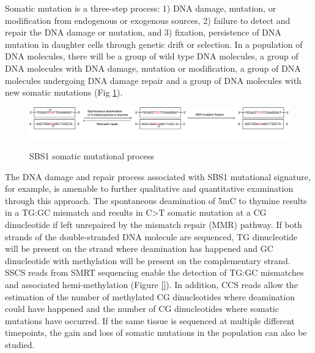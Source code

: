 Somatic mutation is a three-step process: 1) DNA damage, mutation, or modification from endogenous or exogenous sources, 2) failure to detect and repair the DNA damage or mutation, and 3) fixation, persistence of DNA mutation in daughter cells through genetic drift or selection. In a population of DNA molecules, there will be a group of wild type DNA molecules, a group of DNA molecules with DNA damage, mutation or modification, a group of DNA molecules undergoing DNA damage repair and a group of DNA molecules with new somatic mutations (Fig \ref{figure:single-strand-specific-mutation}). 

\begin{figure}[h]
\caption{SBS1 somatic mutational process}
\label{figure:single-strand-specific-mutation}
\centering
\includegraphics[width=1\textwidth]{chapter4_fig3.jpg} \\ \smallskip
{}
\end{figure}

The DNA damage and repair process associated with SBS1 mutational signature, for example, is amenable to further qualitative and quantitative examination through this approach. The spontaneous deamination of 5mC to thymine results in a TG:GC mismatch and results in C>T somatic mutation at a CG dinucleotide if left unrepaired by the mismatch repair (MMR) pathway. If both strands of the double-stranded DNA molecule are sequenced, TG dinucleotide will be present on the strand where deamination has happened and GC dinucleotide with methylation will be present on the complementary strand. SSCS reads from SMRT sequencing enable the detection of TG:GC mismatches and associated hemi-methylation (Figure \ref{}). In addition, CCS reads allow the estimation of the number of methylated CG dinucleotides where deamination could have happened and the number of CG dinucleotides where somatic mutations have occurred. If the same tissue is sequenced at multiple different timepoints, the gain and loss of somatic mutations in the population can also be studied.

